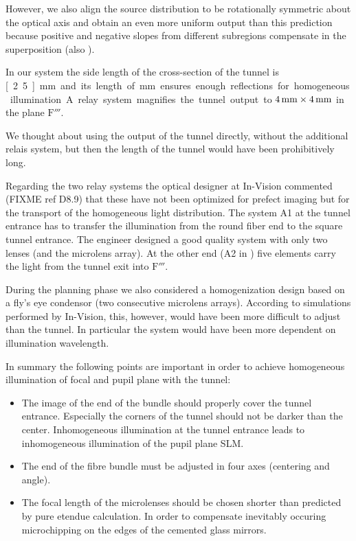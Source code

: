 However, we also align the source distribution to be rotationally
symmetric about the optical axis and obtain an even more uniform
output than this prediction because positive and negative slopes from
different subregions compensate in the superposition (also
\cite{Koshel2012}).

In our system the side length of the cross-section of the tunnel is
\unit[2.5]{mm} and its length of \unit[250]{mm} ensures enough
reflections for homogeneous illumination. A relay system magnifies the
tunnel output to $\unit[4]{mm}\times\unit[4]{mm}$ in the plane
$\textrm{F}'''$.

We thought about using the output of the tunnel directly, without the
additional relais system, but then the length of the tunnel would have
been prohibitively long.


Regarding the two relay systems the optical designer at In-Vision
commented (FIXME ref D8.9) that these have not been optimized for
prefect imaging but for the transport of the homogeneous light
distribution. The system A1 at the tunnel entrance has to transfer the
illumination from the round fiber end to the square tunnel
entrance. The engineer designed a good quality system with only two
lenses (and the microlens array). At the other end (A2 in
) five elements carry the light from the tunnel
exit into $\textrm{F}'''$.

During the planning phase we also considered a homogenization design
based on a fly's eye condensor (two consecutive microlens
arrays). According to simulations performed by In-Vision, this,
however, would have been more difficult to adjust than the tunnel. In
particular the system would have been more dependent on illumination
wavelength.

In summary the following points are important in order to achieve
homogeneous illumination of focal and pupil plane with the tunnel:
\begin{itemize}
\item The image of the end of the bundle should properly cover the
  tunnel entrance. Especially the corners of the tunnel should not be
  darker than the center. Inhomogeneous illumination at the tunnel
  entrance leads to inhomogeneous illumination of the pupil plane SLM.
\item The end of the fibre bundle must be adjusted in four axes
  (centering and angle).
\item The focal length of the microlenses should be chosen shorter
  than predicted by pure etendue calculation. In order to compensate
  inevitably occuring microchipping on the edges of the cemented glass
  mirrors.
\end{itemize}

